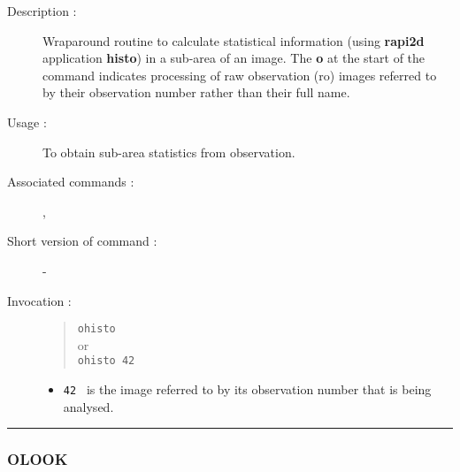 \begin{description}

\item[Description :] Wraparound routine to calculate statistical
information (using {\bf rapi2d} application {\bf histo}) in a sub-area of an
image. The {\bf o} at the start of the command indicates processing of raw
observation ({\sc ro}) images referred to by their observation number
rather than their full name.

\item[Usage :] To obtain sub-area statistics from observation.
\item[Associated commands :] {\tt {}},
{\tt {}}
\item[Short version of command :] -
\item[Invocation :]

\begin{quote}{\tt  ohisto }\\
or \\
{\tt ohisto 42 }
\end{quote}

\begin{itemize}

\item {\tt 42 } is the image referred to by its observation number that
  is being analysed.
\end{itemize}

\end{description}

\hrule
\subsubsection*{\label{OLOOK}OLOOK}

